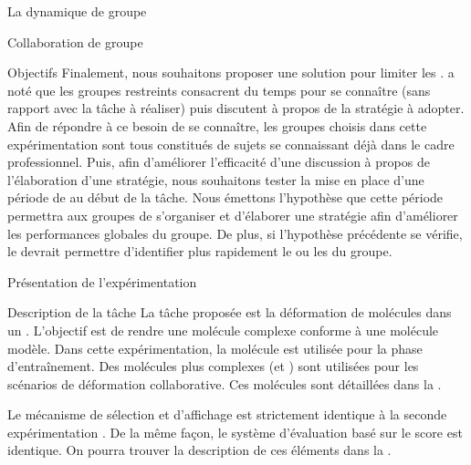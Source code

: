 \documentclass[myfrancais,ngerman,english,frenchb]{mythesis}
\begin{document}
\begin{mychapter}{La dynamique de groupe}
\begin{mysection}{Collaboration de groupe}
\begin{mysubsection}{Objectifs}
				Finalement, nous souhaitons proposer une solution pour limiter les .
				 a noté que les groupes restreints consacrent du temps pour se connaître (sans rapport avec la tâche à réaliser) puis discutent à propos de la stratégie à adopter.
				Afin de répondre à ce besoin de se connaître, les groupes choisis dans cette expérimentation sont tous constitués de sujets se connaissant déjà dans le cadre professionnel.
				Puis, afin d'améliorer l'efficacité d'une discussion à propos de l'élaboration d'une stratégie, nous souhaitons tester la mise en place d'une période de \mybrainstorming au début de la tâche.
				Nous émettons l'hypothèse que cette période permettra aux groupes de s'organiser et d'élaborer une stratégie afin d'améliorer les performances globales du groupe.
				De plus, si l'hypothèse précédente se vérifie, le \mybrainstorming devrait permettre d'identifier plus rapidement le ou les  du groupe.
			\end{mysubsection}
		\end{mysection}
		\begin{mysection}{Présentation de l'expérimentation}
			\begin{mysubsection}{Description de la tâche}
				La tâche proposée est la déformation de molécules dans un .
				L'objectif est de rendre une molécule complexe conforme à une molécule modèle.
				Dans cette expérimentation, la molécule \myTRPCAGE est utilisée pour la phase d'entraînement.
				Des molécules plus complexes (\myPrion et \myUbiquitin) sont utilisées pour les scénarios de déformation collaborative.
				Ces molécules sont détaillées dans la .

				Le mécanisme de sélection et d'affichage est strictement identique à la seconde expérimentation .
				De la même façon, le système d'évaluation basé sur le score  est identique.
				On pourra trouver la description de ces éléments dans la .


\end{mysubsection}
\end{mysection}
\end{mychapter}
\end{document}
